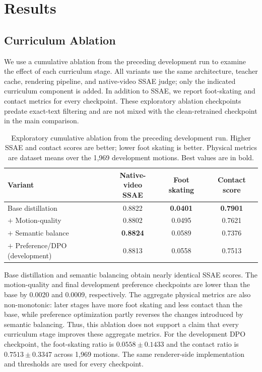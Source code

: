 \documentclass[runningheads]{llncs}
\begin{document}
\section{Results}

\subsection{Curriculum Ablation}

We use a cumulative ablation from the preceding development run to examine the
effect of each curriculum stage. All variants use the same architecture,
teacher cache, rendering pipeline, and native-video SSAE judge; only the
indicated curriculum component is added. In addition to SSAE, we report
foot-skating and contact metrics for every checkpoint. These exploratory
ablation checkpoints predate exact-text filtering and are not mixed with the
clean-retrained checkpoint in the main comparison.

\begin{table}
\caption{Exploratory cumulative ablation from the preceding development run.
Higher SSAE and contact scores are better; lower foot skating is better.
Physical metrics are dataset means over the 1,969 development motions. Best
values are in bold.}
\label{tab:curriculum-ablation}
\centering
\small
\setlength{\tabcolsep}{6pt}
\renewcommand{\arraystretch}{1.2}
\begin{tabular*}{\textwidth}{@{\extracolsep{\fill}}lccc@{}}
\hline
Variant & \shortstack{Native-video\\SSAE} & Foot skating & Contact score \\
\hline
Base distillation & 0.8822 & \textbf{0.0401} & \textbf{0.7901} \\
$+$ Motion-quality & 0.8802 & 0.0495 & 0.7621 \\
$+$ Semantic balance & \textbf{0.8824} & 0.0589 & 0.7376 \\
$+$ Preference/DPO (development) & 0.8813 & 0.0558 & 0.7513 \\
\hline
\end{tabular*}
\end{table}

Base distillation and semantic balancing obtain nearly identical SSAE scores.
The motion-quality and final development preference checkpoints are lower than the base by
0.0020 and 0.0009, respectively. The aggregate physical metrics are also
non-monotonic: later stages have more foot skating and less contact than the
base, while preference optimization partly reverses the changes introduced by
semantic balancing. Thus, this ablation does not support a claim that every
curriculum stage improves these aggregate metrics. For the development DPO
checkpoint, the foot-skating ratio is $0.0558\pm0.1433$ and the contact ratio
is $0.7513\pm0.3347$ across 1,969 motions. The same renderer-side implementation
and thresholds are used for every checkpoint.
\end{document}

